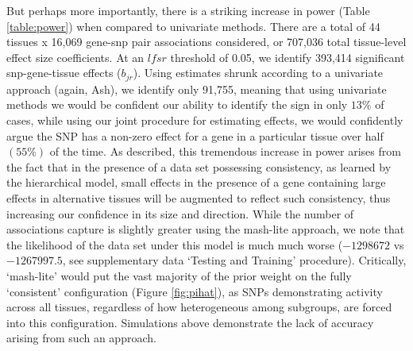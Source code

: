 But perhaps more importantly, there is a striking increase in power (Table \ref{table:power}) when compared to univariate methods. There are a total of 44 tissues x 16,069 gene-snp pair associations considered, or 707,036 total tissue-level effect size coefficients. At an $lfsr$ threshold of 0.05, we identify 393,414 significant snp-gene-tissue effects ($b_{jr}$). Using estimates shrunk according to a univariate approach (again, Ash),  we identify only 91,755, meaning that using univariate methods we would be confident our ability to identify the sign in only $13\%$ of cases, while using our joint procedure for estimating effects, we would confidently argue the SNP has a non-zero effect for a gene in a particular tissue over half $(55\%)$ of the time. As described, this tremendous increase in power arises from the fact that in the presence of  a data set possessing consistency, as learned by the hierarchical model, small effects in the presence of a gene containing large effects in alternative tissues will be augmented to reflect such consistency, thus increasing our confidence in its size and direction. While the number of associations capture is slightly greater using the mash-lite approach, we note that the likelihood of the data set under this model is much much worse ($-1298672$ vs $-1267997.5$, see supplementary data `Testing and Training' procedure). Critically, `mash-lite' would put the vast majority of the prior weight on the fully `consistent' configuration (Figure \ref{fig:pihat}), as SNPs demonstrating activity across all tissues, regardless of how heterogeneous among subgroups, are forced into this configuration. Simulations above demonstrate the lack of accuracy arising from such an approach.%


